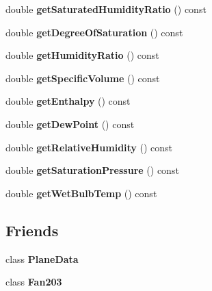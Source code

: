 \begin{DoxyCompactItemize}
double {\bfseries get\+Saturated\+Humidity\+Ratio} () const
\item 
\mbox{\label{class_base_gas_density_aa6ea4360eda19076a8d074a4ab798278}} 
double {\bfseries get\+Degree\+Of\+Saturation} () const
\item 
\mbox{\label{class_base_gas_density_a5b7afba9ca1aaf9ef5df56fea9f901bd}} 
double {\bfseries get\+Humidity\+Ratio} () const
\item 
\mbox{\label{class_base_gas_density_af641ae2a0142ac83a21224108a087c50}} 
double {\bfseries get\+Specific\+Volume} () const
\item 
\mbox{\label{class_base_gas_density_a0180adfa955225f6044cb4c7145b9919}} 
double {\bfseries get\+Enthalpy} () const
\item 
\mbox{\label{class_base_gas_density_afd2e1ee6bd8d830be9fc0342709d7a37}} 
double {\bfseries get\+Dew\+Point} () const
\item 
\mbox{\label{class_base_gas_density_a2975d7c69747df8fde8a84fca540a435}} 
double {\bfseries get\+Relative\+Humidity} () const
\item 
\mbox{\label{class_base_gas_density_a2c85831959bdb0b5e6eab370e9408678}} 
double {\bfseries get\+Saturation\+Pressure} () const
\item 
\mbox{\label{class_base_gas_density_a1089d2316a305d825309ed39f3af7454}} 
double {\bfseries get\+Wet\+Bulb\+Temp} () const
\end{DoxyCompactItemize}
\subsection*{Friends}
\begin{DoxyCompactItemize}
\item 
\mbox{\label{class_base_gas_density_a31f6bbdce0894df6a817f493afffda84}} 
class {\bfseries Plane\+Data}
\item 
\mbox{\label{class_base_gas_density_ad537df0087a4a6f474dc9d50579cc33d}} 
class {\bfseries Fan203}
\end{DoxyCompactItemize}


